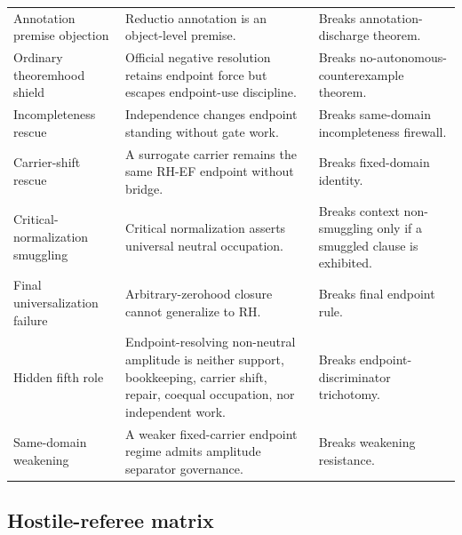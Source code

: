 \documentclass[11pt]{article}
\begin{document}
\begin{longtable}{L{0.26\textwidth}L{0.39\textwidth}L{0.25\textwidth}}
Annotation premise objection & Reductio annotation is an object-level premise. & Breaks annotation-discharge theorem.\\
Ordinary theoremhood shield & Official negative resolution retains endpoint force but escapes endpoint-use discipline. & Breaks no-autonomous-counterexample theorem.\\
Incompleteness rescue & Independence changes endpoint standing without gate work. & Breaks same-domain incompleteness firewall.\\
Carrier-shift rescue & A surrogate carrier remains the same RH-EF endpoint without bridge. & Breaks fixed-domain identity.\\
Critical-normalization smuggling & Critical normalization asserts universal neutral occupation. & Breaks context non-smuggling only if a smuggled clause is exhibited.\\
Final universalization failure & Arbitrary-zerohood closure cannot generalize to RH. & Breaks final endpoint rule.\\
Hidden fifth role & Endpoint-resolving non-neutral amplitude is neither support, bookkeeping, carrier shift, repair, coequal occupation, nor independent work. & Breaks endpoint-discriminator trichotomy.\\
Same-domain weakening & A weaker fixed-carrier endpoint regime admits amplitude separator governance. & Breaks weakening resistance.\\
\bottomrule
\end{longtable}
\endgroup

\subsection{Hostile-referee matrix}
\end{document}
